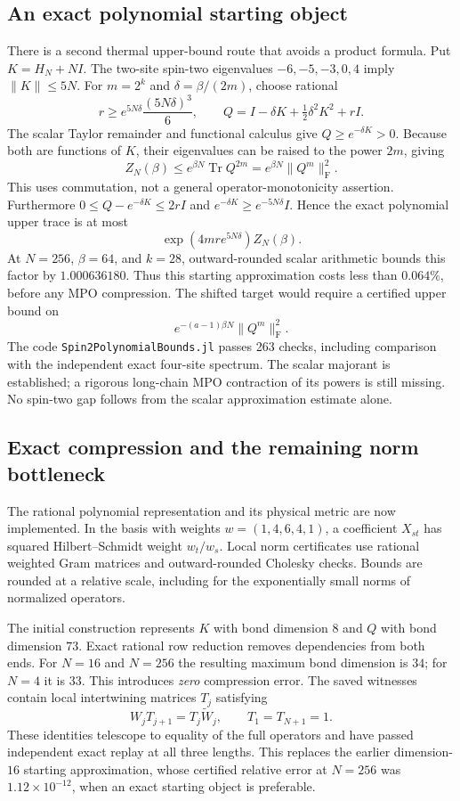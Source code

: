 \documentclass[11pt]{article}
\newcommand{\Tr}{\operatorname{Tr}}
\begin{document}
\subsection{An exact polynomial starting object}
There is a second thermal upper-bound route that avoids a product formula.
Put $K=H_N+NI$. The two-site spin-two eigenvalues
$-6,-5,-3,0,4$ imply $\|K\|\le5N$. For $m=2^k$ and
$\delta=\beta/(2m)$, choose rational
\[
 r\ge e^{5N\delta}\frac{(5N\delta)^3}{6},\qquad
 Q=I-\delta K+\tfrac12\delta^2K^2+rI.
\]
The scalar Taylor remainder and functional calculus give
$Q\ge e^{-\delta K}>0$. Because both are functions of $K$, their
eigenvalues can be raised to the power $2m$, giving
\[
 Z_N(\beta)\le e^{\beta N}\Tr Q^{2m}
 =e^{\beta N}\|Q^m\|_{\mathrm F}^2.
\]
This uses commutation, not a general operator-monotonicity assertion.
Furthermore $0\le Q-e^{-\delta K}\le2rI$ and
$e^{-\delta K}\ge e^{-5N\delta}I$. Hence the exact polynomial upper
trace is at most
\[
 \exp\!\left(4mr e^{5N\delta}\right) Z_N(\beta).
\]
At $N=256$, $\beta=64$, and $k=28$, outward-rounded scalar arithmetic
bounds this factor by $1.000636180$. Thus this starting approximation
costs less than $0.064\%$, before any MPO compression. The shifted
target would require a certified upper bound on
\[
 e^{-(a-1)\beta N}\|Q^m\|_{\mathrm F}^2.
\]
The code \texttt{Spin2PolynomialBounds.jl} passes 263 checks, including
comparison with the independent exact four-site spectrum. The scalar
majorant is established; a rigorous long-chain MPO contraction of its
powers is still missing. No spin-two gap follows from the scalar
approximation estimate alone.

\subsection{Exact compression and the remaining norm bottleneck}
The rational polynomial representation and its physical metric are now
implemented. In the basis with weights $w=(1,4,6,4,1)$, a coefficient
$X_{st}$ has squared Hilbert--Schmidt weight $w_t/w_s$. Local norm
certificates use rational weighted Gram matrices and outward-rounded
Cholesky checks. Bounds are rounded at a relative scale, including for
the exponentially small norms of normalized operators.

The initial construction represents $K$ with bond dimension $8$ and
$Q$ with bond dimension $73$. Exact rational row reduction removes
dependencies from both ends. For $N=16$ and $N=256$ the resulting maximum
bond dimension is $34$; for $N=4$ it is $33$. This introduces
\emph{zero} compression error. The saved witnesses contain local
intertwining matrices $T_j$ satisfying
\[
 W_j T_{j+1}=T_j\widetilde W_j,\qquad T_1=T_{N+1}=1.
\]
These identities telescope to equality of the full operators and have
passed independent exact replay at all three lengths. This replaces the
earlier dimension-$16$ starting approximation, whose certified relative
error at $N=256$ was $1.12\times10^{-12}$, when an exact starting object
is preferable.
\end{document}
